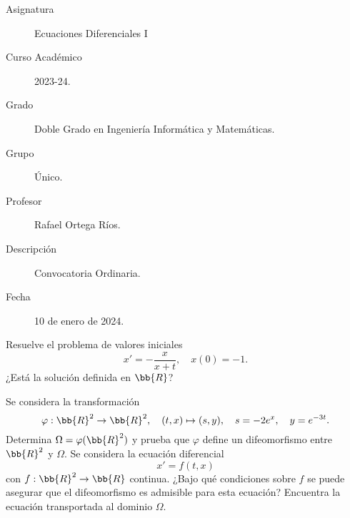 \documentclass[12pt]{article}
\begin{document}

    
    

    \begin{description}
        \item[Asignatura] Ecuaciones Diferenciales I
        \item[Curso Académico] 2023-24.
        \item[Grado] Doble Grado en Ingeniería Informática y Matemáticas.
        \item[Grupo] Único.
        \item[Profesor] Rafael Ortega Ríos.
        \item[Descripción] Convocatoria Ordinaria.
        \item[Fecha] 10 de enero de 2024.
    
    \end{description}
    \newpage

    \begin{ejercicio}
        Resuelve el problema de valores iniciales
        \[
            x' = -\frac{x}{x+t}, \quad x(0) = -1.
        \]
        ¿Está la solución definida en $\bb{R}$?
    \end{ejercicio}

    \begin{ejercicio}
        Se considera la transformación
        \[
            \varphi : \bb{R}^2 \to \bb{R}^2, \quad (t, x) \mapsto (s, y), \quad s = -2e^x, \quad y = e^{-3t}.
        \]
        Determina $\Omega = \varphi(\bb{R}^2)$ y prueba que $\varphi$ define un difeomorfismo entre $\bb{R}^2$ y $\Omega$.
        Se considera la ecuación diferencial
        \[
            x' = f(t, x)
        \]
        con $f : \bb{R}^2 \to \bb{R}$ continua. ¿Bajo qué condiciones sobre $f$ se puede asegurar que el difeomorfismo es admisible para esta ecuación? Encuentra la ecuación transportada al dominio $\Omega$.
    \end{ejercicio}
\end{document}
